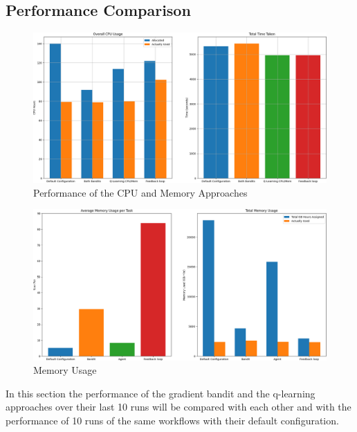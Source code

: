 \subsection{Performance Comparison}
\label{sub:comp_perf}

\begin{figure}
    \centering
        \includegraphics[width=\textwidth]{fig/cpu_mem_results.png}
        \caption{Performance of the CPU and Memory Approaches}
        \label{fig:cpu_results}
\end{figure}

\begin{figure}
    \centering
        \includegraphics[width=\textwidth]{fig/cropped_memory_usage_final.png}
        \caption{Memory Usage}
        \label{fig:mem_use}
\end{figure}

In this section the performance of the gradient bandit and the q-learning approaches over their last 10 runs will be compared with each other and with the performance of 10 runs of the same workflows with their default configuration.

